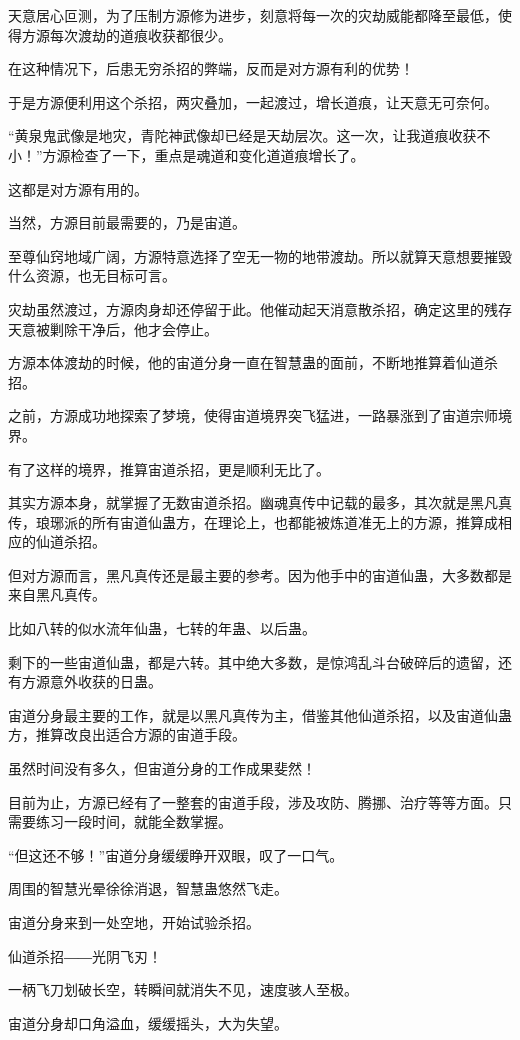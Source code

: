 \begin{this_body}
天意居心叵测，为了压制方源修为进步，刻意将每一次的灾劫威能都降至最低，使得方源每次渡劫的道痕收获都很少。

在这种情况下，后患无穷杀招的弊端，反而是对方源有利的优势！

于是方源便利用这个杀招，两灾叠加，一起渡过，增长道痕，让天意无可奈何。

“黄泉鬼武像是地灾，青陀神武像却已经是天劫层次。这一次，让我道痕收获不小！”方源检查了一下，重点是魂道和变化道道痕增长了。

这都是对方源有用的。

当然，方源目前最需要的，乃是宙道。

至尊仙窍地域广阔，方源特意选择了空无一物的地带渡劫。所以就算天意想要摧毁什么资源，也无目标可言。

灾劫虽然渡过，方源肉身却还停留于此。他催动起天消意散杀招，确定这里的残存天意被剿除干净后，他才会停止。

方源本体渡劫的时候，他的宙道分身一直在智慧蛊的面前，不断地推算着仙道杀招。

之前，方源成功地探索了梦境，使得宙道境界突飞猛进，一路暴涨到了宙道宗师境界。

有了这样的境界，推算宙道杀招，更是顺利无比了。

其实方源本身，就掌握了无数宙道杀招。幽魂真传中记载的最多，其次就是黑凡真传，琅琊派的所有宙道仙蛊方，在理论上，也都能被炼道准无上的方源，推算成相应的仙道杀招。

但对方源而言，黑凡真传还是最主要的参考。因为他手中的宙道仙蛊，大多数都是来自黑凡真传。

比如八转的似水流年仙蛊，七转的年蛊、以后蛊。

剩下的一些宙道仙蛊，都是六转。其中绝大多数，是惊鸿乱斗台破碎后的遗留，还有方源意外收获的日蛊。

宙道分身最主要的工作，就是以黑凡真传为主，借鉴其他仙道杀招，以及宙道仙蛊方，推算改良出适合方源的宙道手段。

虽然时间没有多久，但宙道分身的工作成果斐然！

目前为止，方源已经有了一整套的宙道手段，涉及攻防、腾挪、治疗等等方面。只需要练习一段时间，就能全数掌握。

“但这还不够！”宙道分身缓缓睁开双眼，叹了一口气。

周围的智慧光晕徐徐消退，智慧蛊悠然飞走。

宙道分身来到一处空地，开始试验杀招。

仙道杀招――光阴飞刃！

一柄飞刀划破长空，转瞬间就消失不见，速度骇人至极。

宙道分身却口角溢血，缓缓摇头，大为失望。


\end{this_body}
